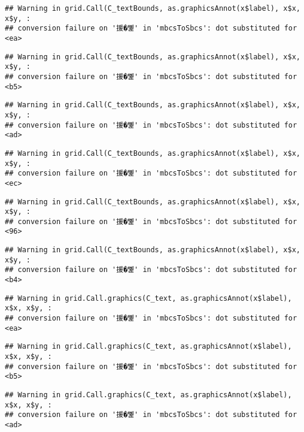 \documentclass[
]{article}
\begin{document}
\begin{verbatim}
## Warning in grid.Call(C_textBounds, as.graphicsAnnot(x$label), x$x, x$y, :
## conversion failure on '援�뼱' in 'mbcsToSbcs': dot substituted for <ea>
\end{verbatim}

\begin{verbatim}
## Warning in grid.Call(C_textBounds, as.graphicsAnnot(x$label), x$x, x$y, :
## conversion failure on '援�뼱' in 'mbcsToSbcs': dot substituted for <b5>
\end{verbatim}

\begin{verbatim}
## Warning in grid.Call(C_textBounds, as.graphicsAnnot(x$label), x$x, x$y, :
## conversion failure on '援�뼱' in 'mbcsToSbcs': dot substituted for <ad>
\end{verbatim}

\begin{verbatim}
## Warning in grid.Call(C_textBounds, as.graphicsAnnot(x$label), x$x, x$y, :
## conversion failure on '援�뼱' in 'mbcsToSbcs': dot substituted for <ec>
\end{verbatim}

\begin{verbatim}
## Warning in grid.Call(C_textBounds, as.graphicsAnnot(x$label), x$x, x$y, :
## conversion failure on '援�뼱' in 'mbcsToSbcs': dot substituted for <96>
\end{verbatim}

\begin{verbatim}
## Warning in grid.Call(C_textBounds, as.graphicsAnnot(x$label), x$x, x$y, :
## conversion failure on '援�뼱' in 'mbcsToSbcs': dot substituted for <b4>
\end{verbatim}

\begin{verbatim}
## Warning in grid.Call.graphics(C_text, as.graphicsAnnot(x$label), x$x, x$y, :
## conversion failure on '援�뼱' in 'mbcsToSbcs': dot substituted for <ea>
\end{verbatim}

\begin{verbatim}
## Warning in grid.Call.graphics(C_text, as.graphicsAnnot(x$label), x$x, x$y, :
## conversion failure on '援�뼱' in 'mbcsToSbcs': dot substituted for <b5>
\end{verbatim}

\begin{verbatim}
## Warning in grid.Call.graphics(C_text, as.graphicsAnnot(x$label), x$x, x$y, :
## conversion failure on '援�뼱' in 'mbcsToSbcs': dot substituted for <ad>
\end{verbatim}
\end{document}
